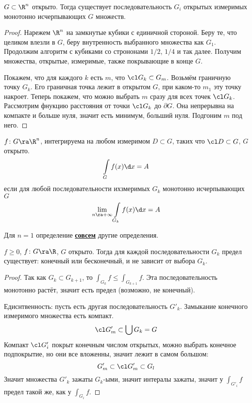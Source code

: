 \begin{theorem}
	$G \subset \R^n$ открыто.
	Тогда существует последовательность $G_i$ открытых измеримых монотонно исчерпывающих $G$ множеств.
\end{theorem}

\begin{proof}
	Нарежем $\R^n$ на замкнутые кубики с единичной стороной.
	Беру те, что целиком влезли в $G$, беру внутренность выбранного множества как $G_1$.
	Продолжим алгоритм с кубиками со стрононами $1/2$, $1/4$ и так далее.
	Получим множества, открытые, измеримые, также покрывающие в конце $G$.

	Покажем, что для каждого $k$ есть $m$, что $\cl G_k \subset G_m$.
	Возьмём граничную точку $G_k$. Его граничная точка лежит в открытом $G$, при каком-то $m_1$ эту точку накроет.
	Теперь покажем, что можно выбрать $m$ сразу для всех точек $\cl G_k$.
	Рассмотрим фнукцию расстояния от точки $\cl G_k$ до $\partial G$.
	Она непрерывна на компакте и больше нуля, значит есть минимум, больший нуля.
	Подгоним $m$ под него.
\end{proof}

\begin{Def}
	$f\colon G \ra \R^n$, интегрируема на любом измеримом $D \subset G$, таких что $\cl D \subset G$, $G$ открыто.
	\[ \int\limits_G f(x) \d x = A \]
	если для любой последовательности ихзмеримых $G_k$ монотонно исчерпывающих $G$
	\[ \lim_{n\ra+\infty} \int\limits_{G_k} f(x) \d x = A \]
\end{Def}
\begin{Rem}
	Для $n = 1$ определение \underline{\bf совсем} другие определения.
\end{Rem}

\begin{theorem}
	$f \ge 0$, $f\colon G \ra \R$, $G$ открыто.
	Тогда для каждой последовательности $G_k$ предел существует: конечный или бесконечный, и не зависит от выбора $G_k$.
\end{theorem}
\begin{proof}
	Так как $G_k \subset G_{k+1}$, то $\int_{G_k} f \le \int_{G_{k+1}} f$.
	Эта последовательность монотонно растёт, значит есть предел (возможно, не конечный).

	Едиснтвенность: пусть есть другая последовательность $G'_k$.
	Замыкание конечного измеримого множества есть компакт.
	\[ \cl G'_m \subset \bigcup G_k = G \]
	Компакт $\cl G'_i$ покрыт конечным числом открытых, можно выбрать конечное подпокрытие, но они все вложенны, значит лежит в самом большом:
	\[ G'_m \subset \cl G'_m \subset G_l \]
	Значит множества $G'_k$ зажаты $G_k$-ыми, значит интералы зажаты, значит у $\int_{G'_i} f$ предел такой же, как у $\int_{G_i} f$.
\end{proof}

